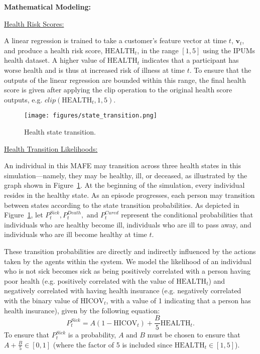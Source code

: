 \textbf{Mathematical Modeling:} 

\underline{Health Risk Scores:} 

A linear regression is trained to take a customer's feature vector at time $t$, $\mathbf{v}_t$, and produce a health risk score, $\text{HEALTH}_t$, in the range $[1,5]$ using the IPUMs health dataset. A higher value of $\text{HEALTH}_t$ indicates that a participant has worse health and is thus at increased risk of illness at time $t$. To ensure that the outputs of the linear regression are bounded within this range, the final health score is given after applying the clip operation to the original health score outputs, e.g. $clip(\text{HEALTH}_t,1,5)$. 


\begin{figure}[t!]
    \centering
    \texttt{[image: figures/state\_transition.png]}
    \caption{Health state transition.} 
    \label{fig:state_transition}
    \vspace{-0mm}
\end{figure}

\underline{Health Transition Likelihoods:} 

An individual in this MAFE may transition across three health states in this simulation---namely, they may be healthy, ill, or deceased, as illustrated by the graph shown in Figure~\ref{fig:state_transition}. At the beginning of the simulation, every individual resides in the healthy state. As an episode progresses, each person may transition between states according to the state transition probabilities. As depicted in Figure~\ref{fig:state_transition}, let $P^{Sick}_t, P^{Death}_t, \text{ and } P^{Cured}_t$ represent the conditional probabilities that individuals who are healthy become ill, individuals who are ill to pass away, and individuals who are ill become healthy at time $t$. 
    
These transition probabilities are directly and indirectly influenced by the actions taken by the agents within the system. We model the likelihood of an individual who is not sick becomes sick as being positively correlated with a person having poor health (e.g. positively correlated with the value of $\text{HEALTH}_t$) and negatively correlated with having health insurance (e.g. negatively correlated with the binary value of $\text{HICOV}_t$, with a value of 1 indicating that a person has health insurance), given by the following equation:
\begin{equation}
    P^{Sick}_t = A(1-\text{HICOV}_t) + \frac{B}{5}\text{HEALTH}_t.
\end{equation}
To ensure that $P^{Sick}_t$ is a probability, $A \text{ and } B$ must be chosen to ensure that $A+\frac{B}{5}\in [0,1]$ (where the factor of 5 is included since $\text{HEALTH}_t\in[1,5]$).

